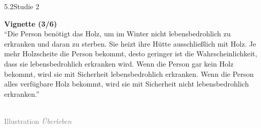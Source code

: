 \documentclass[xcolor=table,9pt,aspectratio=169]{beamer}
\begin{document}
\begin{frame}{\vspace*{10mm}5.2\hspace*{1em}Studie 2}
\begin{multicols}{2}
   \textbf{Vignette (3/6)}\\
   \medskip
   \enquote{Die Person benötigt das Holz, um im Winter nicht lebensbedrohlich zu erkranken und daran zu sterben. Sie heizt ihre Hütte ausschließlich mit Holz. Je mehr Holzscheite die Person bekommt, desto geringer ist die Wahrscheinlichkeit, dass sie lebensbedrohlich erkranken wird. Wenn die Person gar kein Holz bekommt, wird sie mit Sicherheit lebensbedrohlich erkranken. Wenn die Person alles verfügbare Holz bekommt, wird sie mit Sicherheit nicht lebensbedrohlich erkranken.}\\
   \vfill
   \begin{center}
      \\
      \textcolor{gray}{Illustration \textit{Überleben}}
   \end{center}
\end{multicols}
\end{frame}
\end{document}
